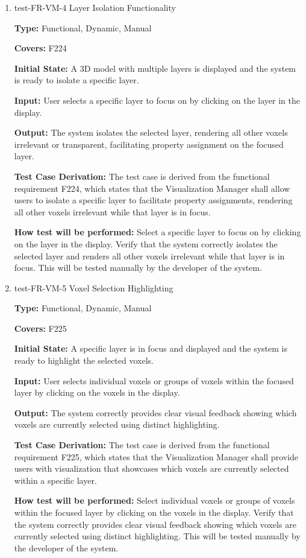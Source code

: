 \documentclass[12pt, titlepage]{article}
\begin{document}
\begin{enumerate}

\item{test-FR-VM-4 Layer Isolation Functionality\\}
\label{sec:t-vm-4}

\textbf{Type:} Functional, Dynamic, Manual

\textbf{Covers:} F224
					
\textbf{Initial State:} A 3D model with multiple layers is displayed and the system is ready to isolate a specific layer.
					
\textbf{Input:} User selects a specific layer to focus on by clicking on the layer in the display.
					
\textbf{Output:} The system isolates the selected layer, rendering all other voxels irrelevant or transparent, facilitating property assignment on the focused layer.

\textbf{Test Case Derivation:} The test case is derived from the functional requirement F224, which states that the Visualization Manager shall allow users to isolate a specific layer to facilitate property assignments, rendering all other voxels irrelevant while that layer is in focus.
					
\textbf{How test will be performed:} Select a specific layer to focus on by clicking on the layer in the display. Verify that the system correctly isolates the selected layer and renders all other voxels irrelevant while that layer is in focus. This will be tested manually by the developer of the system.

\item{test-FR-VM-5 Voxel Selection Highlighting\\}
\label{sec:t-vm-5}

\textbf{Type:} Functional, Dynamic, Manual

\textbf{Covers:} F225
					
\textbf{Initial State:} A specific layer is in focus and displayed and the system is ready to highlight the selected voxels.
					
\textbf{Input:} User selects individual voxels or groups of voxels within the focused layer by clicking on the voxels in the display.
					
\textbf{Output:} The system correctly provides clear visual feedback showing which voxels are currently selected using distinct highlighting.

\textbf{Test Case Derivation:} The test case is derived from the functional requirement F225, which states that the Visualization Manager shall provide users with visualization that showcases which voxels are currently selected within a specific layer.
					
\textbf{How test will be performed:} Select individual voxels or groups of voxels within the focused layer by clicking on the voxels in the display. Verify that the system correctly provides clear visual feedback showing which voxels are currently selected using distinct highlighting. This will be tested manually by the developer of the system.

\end{enumerate}
\end{document}

